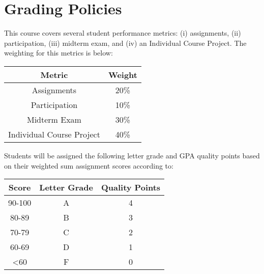 \section*{Grading Policies}
This course covers several student performance metrics: (i) assignments, (ii) participation, (iii) midterm exam, and (iv) an Individual Course Project. The weighting for this metrics is below:
\begin{table*}[ht!]
    \begin{tabular}{c | c}
        \toprule
        Metric                      & Weight \\

        \midrule
        Assignments                 & 20\% \\
        Participation               & 10\% \\
        Midterm Exam                & 30\% \\
        Individual Course Project   & 40\% \\

        \bottomrule
    \end{tabular}
\end{table*}

Students will be assigned the following letter grade and GPA quality points based on their weighted sum assignment scores according to:

\begin{table*}[h!]
    \begin{tabular}{c | c | c}
        \toprule
        Score & Letter Grade & Quality Points \\
        
        \midrule
        90-100              & A     & 4 \\
        80-89               & B     & 3 \\
        70-79               & C     & 2 \\
        60-69\footnotemark  & D     & 1 \\
        <60                 & F     & 0 \\

        \bottomrule
    \end{tabular}
\end{table*}

